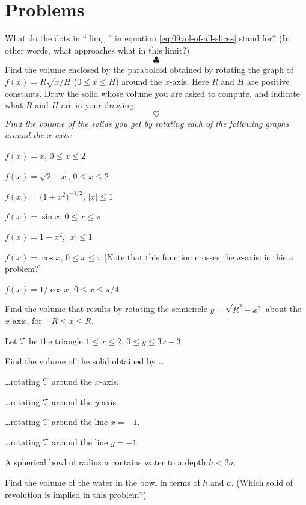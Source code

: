 \section{Problems} %
\problemfont %
\begin{multicols}{2}\setlength{\parindent}{0pt}
\problem \groupproblem What do the dots in ``$\lim_{\cdots}$'' in equation %
\eqref{eq:09vol-of-all-slices} stand for? (In other words, what approaches what
in this limit?)
\[
\clubsuit
\]
\problem  %
Find the volume enclosed by the paraboloid obtained by rotating the
graph of $f(x) = R \sqrt{x/H}$ ($0\leq x\leq H$) around the $x$-axis.
Here $R$ and $H$ are positive constants.  Draw the solid whose volume
you are asked to compute, and indicate what $R$ and $H$ are in your
drawing.
\[
\heartsuit
\]
\begingroup\itshape
Find the volume of the solids you get by rotating each of the
following graphs around the $x$-axis:
\endgroup

\problem $f(x) = x$, $0\leq x\leq 2$  %

\problem $f(x) = \sqrt{2-x}$, $0\leq x\leq 2$  %

\problem $f(x) = \bigl(1+x^2\bigr)^{-1/2}$, $|x|\leq1$  %

\problem $f(x) = \sin x$, $0\leq x\leq \pi$  %

\problem $f(x) = 1-x^2$, $|x|\leq 1$  %

\problem $f(x) = \cos x$, $0\leq x\leq \pi$  [Note that this function crosses %
the $x$-axis: is this a problem?]

\problem $f(x) = 1/\cos x$, $0\leq x\leq \pi/4$  %

\problem  \label{ex:SphereVolume} %
Find the volume that results by rotating the semicircle
$y=\sqrt{R^2-x^2}$ about the $x$-axis, for $-R \leq x \leq R$.

\problem Let $\mathcal{T}$ be the triangle $1\le x\le 2$, $0\le y\le 3x-3$. %
 
Find the volume of the solid obtained by \ldots

\subprob \ldots rotating $\mathcal{T}$ around the $x$-axis.

\subprob \ldots rotating $\mathcal{T}$ around the $y$ axis.

\subprob \ldots rotating $\mathcal{T}$ around the line $x=-1$.

\subprob \ldots rotating $\mathcal{T}$ around the line $y=-1$.



\problem A spherical bowl of radius $a$ contains water to a %
depth $h<2a$. 

\subprob  Find the volume of the water in the bowl in terms of $h$ and $a$.  (Which
solid of revolution is implied in this problem?)


\end{multicols}
